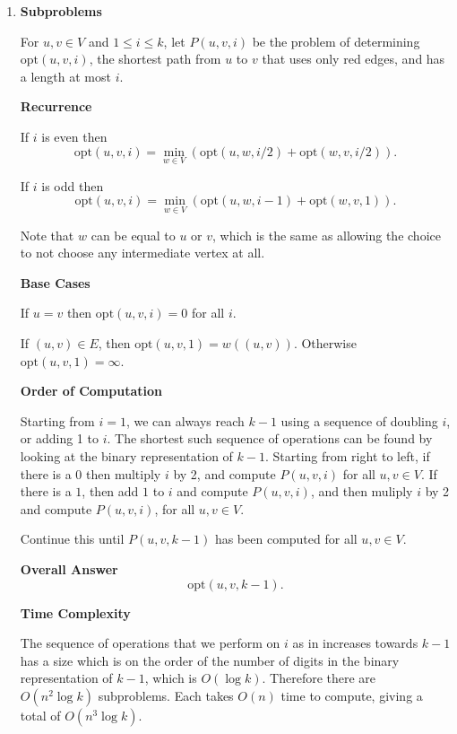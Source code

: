 \documentclass{article}
\begin{document}
\begin{solution}
\begin{enumerate}[label = (\alph*)]
    \item 

    \textbf{Subproblems}

    For $u, v\in V$ and $1\leq i \leq k$, let $P(u, v, i)$ be the problem of determining $\mathrm{opt}(u, v, i)$, the shortest 
    path from $u$ to $v$ that uses only red edges, and has a length at most $i$.

    \textbf{Recurrence}

    If $i$ is even then
    $$
    \mathrm{opt}(u, v, i) = \min_{w \in V}(\mathrm{opt}(u, w, i/2) + \mathrm{opt}(w, v, i/2)).
    $$

    If $i$ is odd then
    $$
    \mathrm{opt}(u, v, i) = \min_{w \in V}(\mathrm{opt}(u, w, i - 1) + \mathrm{opt}(w, v, 1)).
    $$

    Note that $w$ can be equal to $u$ or $v$, which is the same as allowing the choice to not 
    choose any intermediate vertex at all.

    \textbf{Base Cases}

    If $u = v$ then $\mathrm{opt}(u, v, i)=0$ for all $i$. 
    
    If $(u,v)\in E$, then $\mathrm{opt}(u, v, 1)=w((u, v))$. Otherwise $\mathrm{opt}(u, v, 1) = \infty$.

    \textbf{Order of Computation}

    Starting from $i = 1$, we can always reach $k-1$ using a sequence of doubling $i$, or adding 1 to $i$. 
    The shortest such sequence of operations can be found by looking at the binary representation of $k-1$. 
    Starting from right to left, if there is a $0$ then multiply $i$ by 2, and compute $P(u,v,i)$ for all $u,v\in V$.
    If there is a $1$, then add $1$ to $i$ and compute $P(u,v,i)$, and then muliply $i$ by 2 and compute $P(u,v,i)$, for all $u,v\in V$.

    Continue this until $P(u, v, k-1)$ has been computed for all $u,v\in V$.


    \textbf{Overall Answer}
    $$\mathrm{opt}(u, v, k-1).$$

    \textbf{Time Complexity}

    The sequence of operations that we perform on $i$ as in increases towards $k-1$
    has a size which is on the order of the number of digits in the binary representation 
    of $k-1$, which is $O(\log k)$. Therefore there are $O(n^2 \log k)$ subproblems.
    Each takes $O(n)$ time to compute, giving a total of $O(n^3 \log k)$.


\end{enumerate}
\end{solution}
\end{document}
